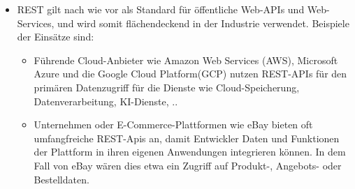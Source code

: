 \begin{itemize}
	\item REST gilt nach wie vor als Standard für öffentliche Web-APIs und Web-Services, und wird somit flächendeckend in der Industrie verwendet. Beispiele der Einsätze sind:
		\begin{itemize}
			\item Führende Cloud-Anbieter wie Amazon Web Services (AWS), Microsoft Azure und die Google Cloud Platform(GCP)  nutzen REST-APIs  für den primären Datenzugriff für  die Dienste wie Cloud-Speicherung, Datenverarbeitung, KI-Dienste, ..
			\item Unternehmen oder E-Commerce-Plattformen wie eBay bieten oft umfangfreiche REST-Apis an, damit Entwickler Daten und Funktionen der Plattform in ihren eigenen Anwendungen integrieren können. In dem Fall von eBay wären dies etwa ein Zugriff auf Produkt-, Angebots- oder Bestelldaten.
		\end{itemize}
		
\parencite{postman-rest-api-examples}
		

\end{itemize}
